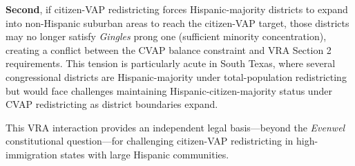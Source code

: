 \textbf{Second}, if citizen-VAP redistricting forces Hispanic-majority districts to expand into non-Hispanic suburban areas to reach the citizen-VAP target, those districts may no longer satisfy \emph{Gingles} prong one (sufficient minority concentration), creating a conflict between the CVAP balance constraint and VRA Section 2 requirements. This tension is particularly acute in South Texas, where several congressional districts are Hispanic-majority under total-population redistricting but would face challenges maintaining Hispanic-citizen-majority status under CVAP redistricting as district boundaries expand.

This VRA interaction provides an independent legal basis---beyond the \emph{Evenwel} constitutional question---for challenging citizen-VAP redistricting in high-immigration states with large Hispanic communities.
